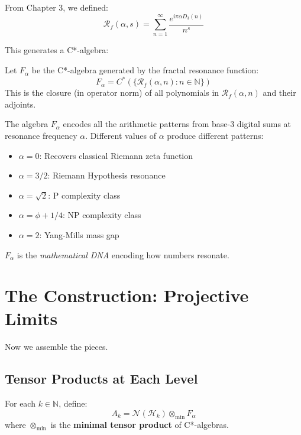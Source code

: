 From Chapter 3, we defined:
\begin{equation}
\mathcal{R}_f(\alpha, s) = \sum_{n=1}^\infty \frac{e^{i\pi\alpha D_3(n)}}{n^s}
\end{equation}

This generates a C*-algebra:

\begin{defn}\label{def:frac-res-algebra}
Let $F_\alpha$ be the C*-algebra generated by the fractal resonance function:
\begin{equation}
F_\alpha = C^*\left(\{\mathcal{R}_f(\alpha, n) : n \in \mathbb{N}\}\right)
\end{equation}
This is the closure (in operator norm) of all polynomials in $\mathcal{R}_f(\alpha, n)$ and their adjoints.
\end{defn}

\begin{intuitive}
The algebra $F_\alpha$ encodes all the arithmetic patterns from base-3 digital sums at resonance frequency $\alpha$. Different values of $\alpha$ produce different patterns:
\begin{itemize}
\item $\alpha = 0$: Recovers classical Riemann zeta function
\item $\alpha = 3/2$: Riemann Hypothesis resonance
\item $\alpha = \sqrt{2}$: P complexity class
\item $\alpha = \phi + 1/4$: NP complexity class
\item $\alpha = 2$: Yang-Mills mass gap
\end{itemize}

$F_\alpha$ is the \textit{mathematical DNA} encoding how numbers resonate.
\end{intuitive}

\section{The Construction: Projective Limits}
\label{sec:construction}

Now we assemble the pieces.

\subsection{Tensor Products at Each Level}

\begin{defn}\label{def:level-k-algebra}
For each $k \in \mathbb{N}$, define:
\begin{equation}
A_k = \mathcal{N}(\mathcal{H}_k) \otimes_{\min} F_\alpha
\end{equation}
where $\otimes_{\min}$ is the \textbf{minimal tensor product} of C*-algebras.
\end{defn}

